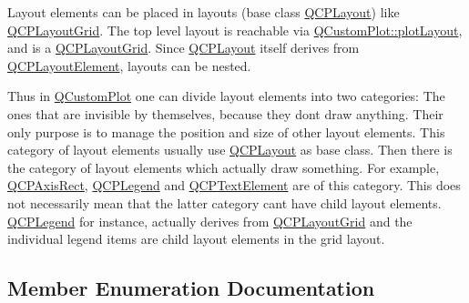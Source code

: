 Layout elements can be placed in layouts (base class \hyperlink{class_q_c_p_layout}{Q\+C\+P\+Layout}) like \hyperlink{class_q_c_p_layout_grid}{Q\+C\+P\+Layout\+Grid}. The top level layout is reachable via \hyperlink{class_q_custom_plot_afd280d4d621ae64a106543a545c508d7}{Q\+Custom\+Plot\+::plot\+Layout}, and is a \hyperlink{class_q_c_p_layout_grid}{Q\+C\+P\+Layout\+Grid}. Since \hyperlink{class_q_c_p_layout}{Q\+C\+P\+Layout} itself derives from \hyperlink{class_q_c_p_layout_element}{Q\+C\+P\+Layout\+Element}, layouts can be nested.

Thus in \hyperlink{class_q_custom_plot}{Q\+Custom\+Plot} one can divide layout elements into two categories\+: The ones that are invisible by themselves, because they don\textquotesingle{}t draw anything. Their only purpose is to manage the position and size of other layout elements. This category of layout elements usually use \hyperlink{class_q_c_p_layout}{Q\+C\+P\+Layout} as base class. Then there is the category of layout elements which actually draw something. For example, \hyperlink{class_q_c_p_axis_rect}{Q\+C\+P\+Axis\+Rect}, \hyperlink{class_q_c_p_legend}{Q\+C\+P\+Legend} and \hyperlink{class_q_c_p_text_element}{Q\+C\+P\+Text\+Element} are of this category. This does not necessarily mean that the latter category can\textquotesingle{}t have child layout elements. \hyperlink{class_q_c_p_legend}{Q\+C\+P\+Legend} for instance, actually derives from \hyperlink{class_q_c_p_layout_grid}{Q\+C\+P\+Layout\+Grid} and the individual legend items are child layout elements in the grid layout. 

\subsection{Member Enumeration Documentation}
